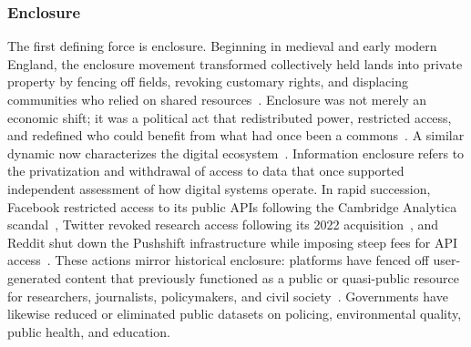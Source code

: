 \documentclass[acmsmall,screen]{acmart}
\begin{document}
\subsubsection*{Enclosure}
The first defining force is enclosure. Beginning in medieval and early modern England, the enclosure movement transformed collectively held lands into private property by fencing off fields, revoking customary rights, and displacing communities who relied on shared resources~\cite{boyle2017second}. Enclosure was not merely an economic shift; it was a political act that redistributed power, restricted access, and redefined who could benefit from what had once been a commons~\cite{hess2003ideas}. A similar dynamic now characterizes the digital ecosystem~\cite{boyle2017second,hess2003ideas,wu_PlatformEnclosureHuman_2021}. Information enclosure refers to the privatization and withdrawal of access to data that once supported independent assessment of how digital systems operate. In rapid succession, Facebook restricted access to its public APIs following the Cambridge Analytica scandal~\cite{confessore_cambridge_2018,van_der_vlist_api_2022}, Twitter revoked research access following its 2022 acquisition~\cite{han_what_2024,stokel-walker_under_2024}, and Reddit shut down the Pushshift infrastructure while imposing steep fees for API access~\cite{isaac_RedditWantsGet_2023,lift_ticket83_RedditDataAPI_2023}. These actions mirror historical enclosure: platforms have fenced off user-generated content that previously functioned as a public or quasi-public resource for researchers, journalists, policymakers, and civil society~\cite{Freelon_ComputationalResearchPostAPI_2018,Bruns_APIcalypsesocialmedia_2019,wu_PlatformEnclosureHuman_2021}. Governments have likewise reduced or eliminated public datasets on policing, environmental quality, public health, and education.
\end{document}
